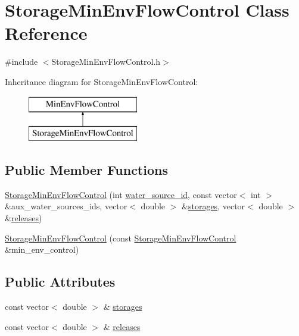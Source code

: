\hypertarget{classStorageMinEnvFlowControl}{}\section{Storage\+Min\+Env\+Flow\+Control Class Reference}
\label{classStorageMinEnvFlowControl}


{\ttfamily \#include $<$Storage\+Min\+Env\+Flow\+Control.\+h$>$}

Inheritance diagram for Storage\+Min\+Env\+Flow\+Control\+:\begin{figure}[H]
\begin{center}
\leavevmode
\includegraphics[height=2.000000cm]{classStorageMinEnvFlowControl}
\end{center}
\end{figure}
\subsection*{Public Member Functions}
\begin{DoxyCompactItemize}
\item 
\mbox{\hyperlink{classStorageMinEnvFlowControl_aba965c28890bf5abb1230dd6d8879f18}{Storage\+Min\+Env\+Flow\+Control}} (int \mbox{\hyperlink{classMinEnvFlowControl_aada518a047598f386daec1d0358023aa}{water\+\_\+source\+\_\+id}}, const vector$<$ int $>$ \&aux\+\_\+water\+\_\+sources\+\_\+ids, vector$<$ double $>$ \&\mbox{\hyperlink{classStorageMinEnvFlowControl_af68170e5f561f1bfc2062f9e6ec8dd6d}{storages}}, vector$<$ double $>$ \&\mbox{\hyperlink{classStorageMinEnvFlowControl_af187563525a0b5b437d27134bff34646}{releases}})
\item 
\mbox{\hyperlink{classStorageMinEnvFlowControl_a2279f6d44b8ba69830a29654ddee8d3a}{Storage\+Min\+Env\+Flow\+Control}} (const \mbox{\hyperlink{classStorageMinEnvFlowControl}{Storage\+Min\+Env\+Flow\+Control}} \&min\+\_\+env\+\_\+control)
\end{DoxyCompactItemize}
\subsection*{Public Attributes}
\begin{DoxyCompactItemize}
\item 
const vector$<$ double $>$ \& \mbox{\hyperlink{classStorageMinEnvFlowControl_af68170e5f561f1bfc2062f9e6ec8dd6d}{storages}}
\item 
const vector$<$ double $>$ \& \mbox{\hyperlink{classStorageMinEnvFlowControl_af187563525a0b5b437d27134bff34646}{releases}}
\end{DoxyCompactItemize}
